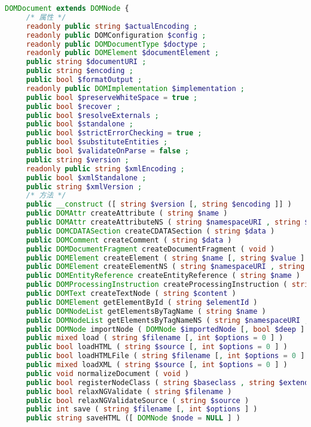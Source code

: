 \begin{lstlisting}[language=PHP]
DOMDocument extends DOMNode {
     /* 属性 */
     readonly public string $actualEncoding ;
     readonly public DOMConfiguration $config ;
     readonly public DOMDocumentType $doctype ;
     readonly public DOMElement $documentElement ;
     public string $documentURI ;
     public string $encoding ;
     public bool $formatOutput ;
     readonly public DOMImplementation $implementation ;
     public bool $preserveWhiteSpace = true ;
     public bool $recover ;
     public bool $resolveExternals ;
     public bool $standalone ;
     public bool $strictErrorChecking = true ;
     public bool $substituteEntities ;
     public bool $validateOnParse = false ;
     public string $version ;
     readonly public string $xmlEncoding ;
     public bool $xmlStandalone ;
     public string $xmlVersion ;
     /* 方法 */
     public __construct ([ string $version [, string $encoding ]] )
     public DOMAttr createAttribute ( string $name )
     public DOMAttr createAttributeNS ( string $namespaceURI , string $qualifiedName )
     public DOMCDATASection createCDATASection ( string $data )
     public DOMComment createComment ( string $data )
     public DOMDocumentFragment createDocumentFragment ( void )
     public DOMElement createElement ( string $name [, string $value ] )
     public DOMElement createElementNS ( string $namespaceURI , string $qualifiedName [, string $value ] )
     public DOMEntityReference createEntityReference ( string $name )
     public DOMProcessingInstruction createProcessingInstruction ( string $target [, string $data ] )
     public DOMText createTextNode ( string $content )
     public DOMElement getElementById ( string $elementId )
     public DOMNodeList getElementsByTagName ( string $name )
     public DOMNodeList getElementsByTagNameNS ( string $namespaceURI , string $localName )
     public DOMNode importNode ( DOMNode $importedNode [, bool $deep ] )
     public mixed load ( string $filename [, int $options = 0 ] )
     public bool loadHTML ( string $source [, int $options = 0 ] )
     public bool loadHTMLFile ( string $filename [, int $options = 0 ] )
     public mixed loadXML ( string $source [, int $options = 0 ] )
     public void normalizeDocument ( void )
     public bool registerNodeClass ( string $baseclass , string $extendedclass )
     public bool relaxNGValidate ( string $filename )
     public bool relaxNGValidateSource ( string $source )
     public int save ( string $filename [, int $options ] )
     public string saveHTML ([ DOMNode $node = NULL ] )

\end{lstlisting}
